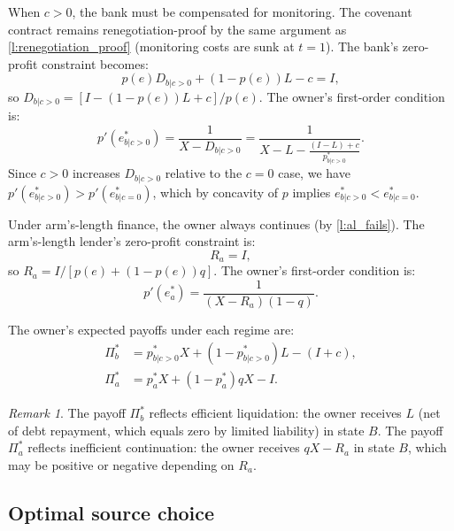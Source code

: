 \documentclass[12pt,a4paper]{article}
\theoremstyle{plain}
\theoremstyle{definition}
\theoremstyle{remark}
\newtheorem{remark}[theorem]{Remark}
\begin{document}
When $c > 0$, the bank must be compensated for monitoring. The covenant contract
remains renegotiation-proof by the same argument as \cref{l:renegotiation_proof}
(monitoring costs are sunk at $t=1$). The bank's zero-profit constraint becomes:
\begin{equation}
  p(e) D_{b|c>0} + (1-p(e)) L - c = I,
  \label{eq:bank_zp_c_pos}
\end{equation}
so $D_{b|c>0} = [I - (1-p(e))L + c]/p(e)$. The owner's first-order condition is:
\begin{equation}
  p'(e^*_{b|c>0}) = \frac{1}{X - D_{b|c>0}}
  = \frac{1}{X - L - \frac{(I-L)+c}{p^*_{b|c>0}}}.
  \label{eq:foc_bank_c_pos}
\end{equation}
Since $c > 0$ increases $D_{b|c>0}$ relative to the $c=0$ case, we have
$p'(e^*_{b|c>0}) > p'(e^*_{b|c=0})$, which by concavity of $p$ implies
$e^*_{b|c>0} < e^*_{b|c=0}$.

Under arm's-length finance, the owner always continues (by \cref{l:al_fails}). The
arm's-length lender's zero-profit constraint is:
\begin{equation}
  [p(e) + (1-p(e))q] R_a = I,
  \label{eq:al_zp}
\end{equation}
so $R_a = I / [p(e) + (1-p(e))q]$. The owner's first-order condition is:
\begin{equation}
  p'(e^*_a) = \frac{1}{(X - R_a)(1-q)}.
  \label{eq:foc_al}
\end{equation}

The owner's expected payoffs under each regime are:
\begin{align}
  \Pi^*_b &= p^*_{b|c>0} X + (1 - p^*_{b|c>0}) L - (I + c),
  \label{eq:payoff_bank} \\
  \Pi^*_a &= p^*_a X + (1 - p^*_a) qX - I.
  \label{eq:payoff_al}
\end{align}

\begin{remark}
\label{r:payoff_comparison}
The payoff $\Pi^*_b$ reflects efficient liquidation: the owner receives $L$ (net of
debt repayment, which equals zero by limited liability) in state $B$. The payoff
$\Pi^*_a$ reflects inefficient continuation: the owner receives $qX - R_a$ in state
$B$, which may be positive or negative depending on $R_a$.
\end{remark}

\subsection{Optimal source choice}
\label{subsec:source_choice}
\end{document}
